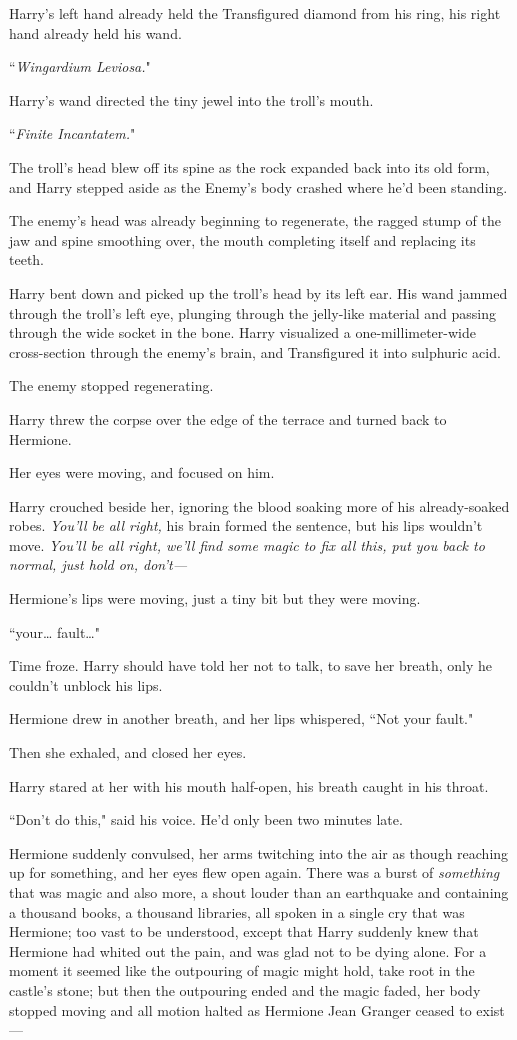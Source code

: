 Harry's left hand already held the Transfigured diamond from his ring, his right hand already held his wand.

``\emph{Wingardium Leviosa.}"

Harry's wand directed the tiny jewel into the troll's mouth.

``\emph{Finite Incantatem.}"

The troll's head blew off its spine as the rock expanded back into its old form, and Harry stepped aside as the Enemy's body crashed where he'd been standing.

The enemy's head was already beginning to regenerate, the ragged stump of the jaw and spine smoothing over, the mouth completing itself and replacing its teeth.

Harry bent down and picked up the troll's head by its left ear. His wand jammed through the troll's left eye, plunging through the jelly-like material and passing through the wide socket in the bone. Harry visualized a one-millimeter-wide cross-section through the enemy's brain, and Transfigured it into sulphuric acid.

The enemy stopped regenerating.

Harry threw the corpse over the edge of the terrace and turned back to Hermione.

Her eyes were moving, and focused on him.

Harry crouched beside her, ignoring the blood soaking more of his already-soaked robes. \emph{You'll be all right,} his brain formed the sentence, but his lips wouldn't move. \emph{You'll be all right, we'll find some magic to fix all this, put you back to normal, just hold on, don't—}

Hermione's lips were moving, just a tiny bit but they were moving.

``your{\ldots} fault{\ldots}"

Time froze. Harry should have told her not to talk, to save her breath, only he couldn't unblock his lips.

Hermione drew in another breath, and her lips whispered, ``Not your fault."

Then she exhaled, and closed her eyes.

Harry stared at her with his mouth half-open, his breath caught in his throat.

``Don't do this," said his voice. He'd only been two minutes late.

Hermione suddenly convulsed, her arms twitching into the air as though reaching up for something, and her eyes flew open again. There was a burst of \emph{something} that was magic and also more, a shout louder than an earthquake and containing a thousand books, a thousand libraries, all spoken in a single cry that was Hermione; too vast to be understood, except that Harry suddenly knew that Hermione had whited out the pain, and was glad not to be dying alone. For a moment it seemed like the outpouring of magic might hold, take root in the castle's stone; but then the outpouring ended and the magic faded, her body stopped moving and all motion halted as Hermione Jean Granger ceased to exist—


